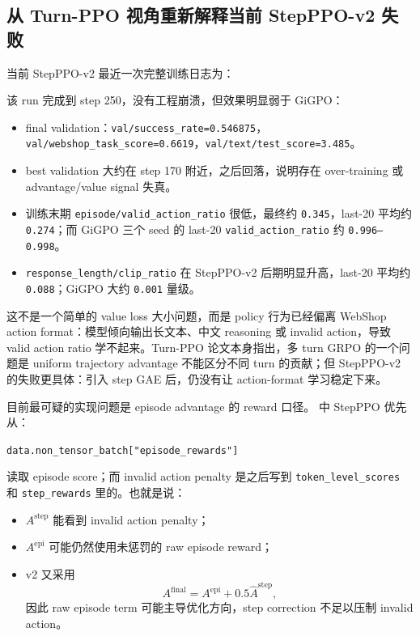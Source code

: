 \documentclass[10pt]{ctexart}
\newcommand{\code}[1]{\texttt{#1}}
\begin{document}
\subsection*{从 Turn-PPO 视角重新解释当前 StepPPO-v2 失败}
当前 StepPPO-v2 最近一次完整训练日志为：
\begin{center}
\end{center}
该 run 完成到 step 250，没有工程崩溃，但效果明显弱于 GiGPO：
\begin{itemize}
  \item final validation：\code{val/success\_rate=0.546875}，\code{val/webshop\_task\_score=0.6619}，\code{val/text/test\_score=3.485}。
  \item best validation 大约在 step 170 附近，之后回落，说明存在 over-training 或 advantage/value signal 失真。
  \item 训练末期 \code{episode/valid\_action\_ratio} 很低，最终约 \code{0.345}，last-20 平均约 \code{0.274}；而 GiGPO 三个 seed 的 last-20 \code{valid\_action\_ratio} 约 \code{0.996--0.998}。
  \item \code{response\_length/clip\_ratio} 在 StepPPO-v2 后期明显升高，last-20 平均约 \code{0.088}；GiGPO 大约 \code{0.001} 量级。
\end{itemize}

这不是一个简单的 value loss 大小问题，而是 policy 行为已经偏离 WebShop action format：模型倾向输出长文本、中文 reasoning 或 invalid action，导致 valid action ratio 学不起来。Turn-PPO 论文本身指出，多 turn GRPO 的一个问题是 uniform trajectory advantage 不能区分不同 turn 的贡献；但 StepPPO-v2 的失败更具体：引入 step GAE 后，仍没有让 action-format 学习稳定下来。

目前最可疑的实现问题是 episode advantage 的 reward 口径。 中 StepPPO 优先从：
\begin{center}
\code{data.non\_tensor\_batch["episode\_rewards"]}
\end{center}
读取 episode score；而 invalid action penalty 是之后写到 \code{token\_level\_scores} 和 \code{step\_rewards} 里的。也就是说：
\begin{itemize}
  \item $A^{\mathrm{step}}$ 能看到 invalid action penalty；
  \item $A^{\mathrm{epi}}$ 可能仍然使用未惩罚的 raw episode reward；
  \item v2 又采用
  \[
  A^{\mathrm{final}}=A^{\mathrm{epi}}+0.5\widehat A^{\mathrm{step}},
  \]
  因此 raw episode term 可能主导优化方向，step correction 不足以压制 invalid action。
\end{itemize}
\end{document}
